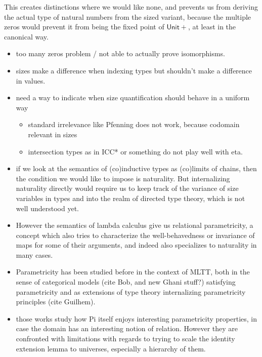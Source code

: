 \documentclass{book}
\begin{document}
This creates distinctions where we would like none, and prevents us
from deriving the actual type of natural numbers from the sized
variant, because the multiple zeros would prevent it from being the
fixed point of $\mathsf{Unit}{+}$, at least in the canonical way.





\begin{itemize}
    \item too many zeros problem / not able to actually prove isomorphisms.
    \item sizes make a difference when indexing types but shouldn't make a difference in values.
    \item need a way to indicate when size quantification should behave in a uniform way
      \begin{itemize}
      \item standard irrelevance like Pfenning does not work, because codomain relevant in sizes
      \item intersection types as in ICC* or something do not play well with eta.
      \end{itemize}

    \item if we look at the semantics of (co)inductive types as (co)limits
    of chains, then the condition we would like to impose is
    naturality. But internalizing naturality directly would require us
    to keep track of the variance of size variables in types and into
    the realm of directed type theory, which is not well understood
    yet.

    \item However the semantics of lambda calculus give us relational
    parametricity, a concept which also tries to characterize the
    well-behavedness or invariance of maps for some of their
    arguments, and indeed also specializes to naturality in many cases.

    \item Parametricity has been studied before in the context of MLTT,
    both in the sense of categorical models (cite Bob, and new Ghani
    stuff?) satisfying parametricity and as extensions of type theory
    internalizing parametricity principles (cite Guilhem).

    \item those works study how Pi itself enjoys interesting parametricity
    properties, in case the domain has an interesting notion of
    relation. However they are confronted with limitations with
    regards to trying to scale the identity extension lemma to
    universes, especially a hierarchy of them.


\end{itemize}
\end{document}
